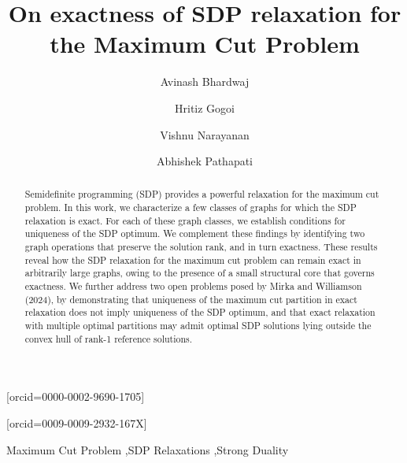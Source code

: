 \documentclass[a4paper,fleqn]{cas-sc}
\newcommand{\1}{\mathbf{1}}
\begin{document}


\title[mode = title]{On exactness of SDP relaxation for the Maximum Cut Problem}


\author[1]{Avinash Bhardwaj}[orcid=0000-0002-9690-1705]
\cormark[1]
\author[1]{Hritiz Gogoi}
\author[1]{Vishnu Narayanan}
\author[1]{Abhishek Pathapati}[orcid=0009-0009-2932-167X]

\begin{keywords}
Maximum Cut Problem \sep SDP Relaxations \sep Strong Duality
\end{keywords}

\maketitle 

\begin{abstract}
Semidefinite programming (SDP) provides a powerful relaxation for the maximum cut problem. In this work, we characterize a few classes of graphs for which the SDP relaxation is exact. For each of these graph classes, we establish conditions for uniqueness of the SDP optimum. We complement these findings by identifying two graph operations that preserve the solution rank, and in turn exactness. These results reveal how the SDP relaxation for the maximum cut problem can remain exact in arbitrarily large graphs, owing to the presence of a small structural core that governs exactness. We further address two open problems posed by Mirka and Williamson (2024), by demonstrating that uniqueness of the maximum cut partition in exact relaxation does not imply uniqueness of the SDP optimum, and that exact relaxation with multiple optimal partitions may admit optimal SDP solutions lying outside the convex hull of rank-1 reference solutions.
\end{abstract}
\end{document}
